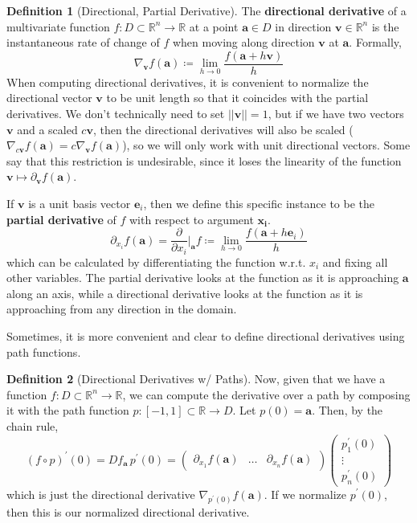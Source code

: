 \documentclass{article}
\theoremstyle{remark}
\theoremstyle{definition}
\newtheorem{definition}{Definition}[section]
\begin{document}
\begin{definition}[Directional, Partial Derivative]
The \textbf{directional derivative} of a multivariate function $f: D \subset \mathbb{R}^n \longrightarrow \mathbb{R}$ at a point $\mathbf{a} \in D$ in direction $\mathbf{v} \in \mathbb{R}^n$ is the instantaneous rate of change of $f$ when moving along direction $\mathbf{v}$ at $\mathbf{a}$. Formally, 
\[\nabla_\mathbf{v} f(\mathbf{a}) \coloneqq \lim_{h \rightarrow 0} \frac{f(\mathbf{a} + h \mathbf{v})}{h}\]
When computing directional derivatives, it is convenient to normalize the directional vector $\mathbf{v}$ to be unit length so that it coincides with the partial derivatives. We don't technically need to set $||\mathbf{v}|| = 1$, but if we have two vectors $\mathbf{v}$ and a scaled $c \mathbf{v}$, then the directional derivatives will also be scaled ($\nabla_{c \mathbf{v}} f (\mathbf{a}) = c \nabla_{\mathbf{v}} f (\mathbf{a})$), so we will only work with unit directional vectors. Some say that this restriction is undesirable, since it loses the linearity of the function $\mathbf{v} \mapsto \partial_\mathbf{v} f (\mathbf{a})$. 

If $\mathbf{v}$ is a unit basis vector $\mathbf{e}_i$, then we define this specific instance to be the \textbf{partial derivative} of $f$ with respect to argument $\mathbf{x_i}$. 
\[\partial_{x_i} f (\mathbf{a}) = \frac{\partial}{\partial x_i} \bigg|_{\mathbf{a}} f \coloneqq \lim_{h \rightarrow 0} \frac{f(\mathbf{a} + h \mathbf{e}_i)}{h} \]
which can be calculated by differentiating the function w.r.t. $x_i$ and fixing all other variables. The partial derivative looks at the function as it is approaching $\mathbf{a}$ along an axis, while a directional derivative looks at the function as it is approaching from any direction in the domain. 
\end{definition}

Sometimes, it is more convenient and clear to define directional derivatives using path functions. 

\begin{definition}[Directional Derivatives w/ Paths]
Now, given that we have a function $f: D \subset \mathbb{R}^n \longrightarrow \mathbb{R}$, we can compute the derivative over a path by composing it with the path function $p: [-1, 1] \subset \mathbb{R} \longrightarrow D$. Let $p(0) = \mathbf{a}$. Then, by the chain rule, 
\[(f \circ p)^\prime (0) = D f_{\mathbf{a}} \, p^\prime(0) = \begin{pmatrix} \partial_{x_1} f (\mathbf{a}) & \ldots & \partial_{x_n} f (\mathbf{a}) \end{pmatrix} \begin{pmatrix} p_1^\prime(0) \\ \vdots \\ p_n^\prime (0) \end{pmatrix}\]
which is just the directional derivative $\nabla_{p^\prime (0)} f (\mathbf{a})$. If we normalize $p^\prime (0)$, then this is our normalized directional derivative. 
\end{definition}
\end{document}
